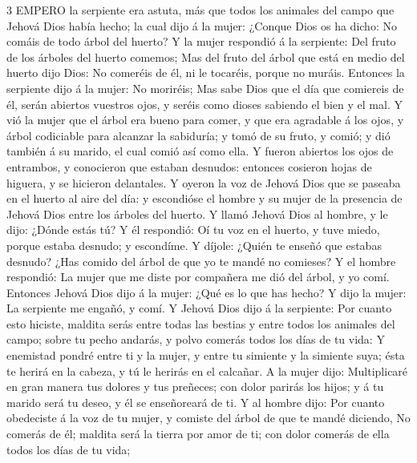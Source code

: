 \lettrine{3}{}
EMPERO la serpiente era astuta, más que todos los animales del campo que Jehová Dios había hecho; la cual dijo á la mujer: ¿Conque Dios os ha dicho: No comáis de todo árbol del huerto? 
Y la mujer respondió á la serpiente: Del fruto de los árboles del huerto comemos; 
Mas del fruto del árbol que está en medio del huerto dijo Dios: No comeréis de él, ni le tocaréis, porque no muráis. 
Entonces la serpiente dijo á la mujer: No moriréis; 
Mas sabe Dios que el día que comiereis de él, serán abiertos vuestros ojos, y seréis como dioses sabiendo el bien y el mal. 
Y vió la mujer que el árbol era bueno para comer, y que era agradable á los ojos, y árbol codiciable para alcanzar la sabiduría; y tomó de su fruto, y comió; y dió también á su marido, el cual comió así como ella. 
Y fueron abiertos los ojos de entrambos, y conocieron que estaban desnudos: entonces cosieron hojas de higuera, y se hicieron delantales. 
Y oyeron la voz de Jehová Dios que se paseaba en el huerto al aire del día: y escondióse el hombre y su mujer de la presencia de Jehová Dios entre los árboles del huerto. 
Y llamó Jehová Dios al hombre, y le dijo: ¿Dónde estás tú? 
Y él respondió: Oí tu voz en el huerto, y tuve miedo, porque estaba desnudo; y escondíme. 
Y díjole: ¿Quién te enseñó que estabas desnudo? ¿Has comido del árbol de que yo te mandé no comieses? 
Y el hombre respondió: La mujer que me diste por compañera me dió del árbol, y yo comí. 
Entonces Jehová Dios dijo á la mujer: ¿Qué es lo que has hecho? Y dijo la mujer: La serpiente me engañó, y comí. 
Y Jehová Dios dijo á la serpiente: Por cuanto esto hiciste, maldita serás entre todas las bestias y entre todos los animales del campo; sobre tu pecho andarás, y polvo comerás todos los días de tu vida: 
Y enemistad pondré entre ti y la mujer, y entre tu simiente y la simiente suya; ésta te herirá en la cabeza, y tú le herirás en el calcañar. 
A la mujer dijo: Multiplicaré en gran manera tus dolores y tus preñeces; con dolor parirás los hijos; y á tu marido será tu deseo, y él se enseñoreará de ti. 
Y al hombre dijo: Por cuanto obedeciste á la voz de tu mujer, y comiste del árbol de que te mandé diciendo, No comerás de él; maldita será la tierra por amor de ti; con dolor comerás de ella todos los días de tu vida; 
